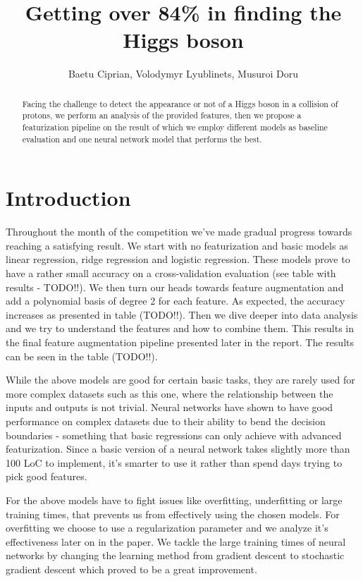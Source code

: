 \documentclass[10pt,conference,compsocconf]{IEEEtran}
\begin{document}
\title{Getting over 84\% in finding the Higgs boson}

\author{
	Baetu Ciprian, Volodymyr Lyublinets, Musuroi Doru
}

\maketitle

\begin{abstract}
Facing the challenge to detect the appearance or not of a Higgs boson in a collision of protons, we perform an analysis of the provided features, then we propose a featurization pipeline on the result of which we employ different models as baseline evaluation and one neural network model that performs the best.
\end{abstract}

\section{Introduction}
Throughout the month of the competition we've made gradual progress towards reaching a satisfying result. 
We start with no featurization and basic models as linear regression, ridge regression and logistic regression. These models prove to have a rather small accuracy on a cross-validation evaluation (see table with results - TODO!!). 
We then turn our heads towards feature augmentation and add a polynomial basis of degree 2 for each feature. As expected, the accuracy increases as presented in table (TODO!!). 
Then we dive deeper into data analysis and we try to understand the features and how to combine them. This results in the final feature augmentation pipeline presented later in the report. The results can be seen in the table (TODO!!). 

While the above models are good for certain basic tasks, they are rarely used for more complex datasets such as this one, where the relationship between the inputs and outputs is not trivial. Neural networks have shown to have good performance on complex datasets due to their ability to bend the decision boundaries - something that basic regressions can only achieve with advanced featurization. Since a basic version of a neural network takes slightly more than 100 LoC to implement, it's smarter to use it rather than spend days trying to pick good features.

For the above models have to fight issues like overfitting, underfitting or large training times, that prevents us from effectively using the chosen models. For overfitting we choose to use a regularization parameter and we analyze it's effectiveness later on in the paper. We tackle the large training times of neural networks by changing the learning method from gradient descent to stochastic gradient descent which proved to be a great improvement.
\end{document}
